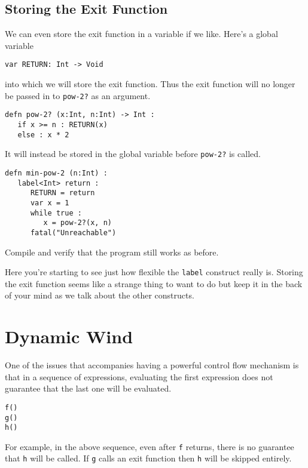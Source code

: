 \documentclass[10pt,oneside]{book}
\begin{document}
\subsection*{Storing the Exit Function}
We can even store the exit function in a variable if we like. Here's a global variable
\begin{lstlisting}
var RETURN: Int -> Void
\end{lstlisting}
into which we will store the exit function. Thus the exit function will no longer be passed in to \texttt{\frenchspacing pow-2?} as an argument.
\begin{lstlisting}
defn pow-2? (x:Int, n:Int) -> Int :
   if x >= n : RETURN(x)
   else : x * 2
\end{lstlisting}
It will instead be stored in the global variable before \texttt{\frenchspacing pow-2?} is called.
\begin{lstlisting}
defn min-pow-2 (n:Int) :
   label<Int> return :
      RETURN = return
      var x = 1
      while true :         
         x = pow-2?(x, n)
      fatal("Unreachable")
\end{lstlisting}
Compile and verify that the program still works as before.

Here you're starting to see just how flexible the \texttt{\frenchspacing label} construct really is. Storing the exit function seems like a strange thing to want to do but keep it in the back of your mind as we talk about the other constructs.

\section{Dynamic Wind}
One of the issues that accompanies having a powerful control flow mechanism is that in a sequence of expressions, evaluating the first expression does not guarantee that the last one will be evaluated.
\begin{lstlisting}
f()
g()
h()
\end{lstlisting}
For example, in the above sequence, even after \texttt{\frenchspacing f} returns, there is no guarantee that \texttt{\frenchspacing h} will be called. If \texttt{\frenchspacing g} calls an exit function then \texttt{\frenchspacing h} will be skipped entirely.
\end{document}
